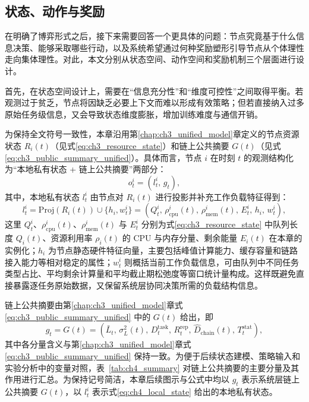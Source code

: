 \subsection{状态、动作与奖励}
\label{subsec:ch4_reward_design}

在明确了博弈形式之后，接下来需要回答一个更具体的问题：节点究竟基于什么信息决策、能够采取哪些行动，以及系统希望通过何种奖励塑形引导节点从个体理性走向集体理性。对此，本文分别从状态空间、动作空间和奖励机制三个层面进行设计。

首先，在状态空间设计上，需要在“信息充分性”和“维度可控性”之间取得平衡。若观测过于贫乏，节点将因缺乏必要上下文而难以形成有效策略；但若直接纳入过多原始任务级信息，又会导致状态维度膨胀，增加训练难度与通信开销。

为保持全文符号一致性，本章沿用第\ref{chap:ch3_unified_model}章定义的节点资源状态 $R_i(t)$（见式\eqref{eq:ch3_resource_state}）和链上公共摘要 $G(t)$（见式\eqref{eq:ch3_public_summary_unified}）。具体而言，节点 $i$ 在时刻 $t$ 的观测结构化为“本地私有状态 + 链上公共摘要”两部分：
\begin{equation}
    o_t^i = \left(l_t^i,\,g_t\right),
    \label{eq:ch4_obs_split}
\end{equation}
其中，本地私有状态 $l_t^i$ 由节点对 $R_i(t)$ 进行投影并补充工作负载特征得到：
\begin{equation}
    l_t^i = \mathrm{Proj}\!\left(R_i(t)\right) \cup \{h_i, w_t^i\}
    = \left(Q_t^i,\,\rho_{\mathrm{cpu}}^i(t),\,\rho_{\mathrm{mem}}^i(t),\,E_t^i,\,h_i,\,w_t^i\right),
    \label{eq:ch4_local_state}
\end{equation}
这里 $Q_t^i$、$\rho_{\mathrm{cpu}}^i(t)$、$\rho_{\mathrm{mem}}^i(t)$ 与 $E_t^i$ 分别为式\eqref{eq:ch3_resource_state} 中队列长度 $Q_i(t)$、资源利用率 $\rho_i(t)$ 的 CPU 与内存分量、剩余能量 $E_i(t)$ 在本章的实例化；$h_i$ 为节点静态硬件特征向量，主要包括峰值计算能力、缓存容量和链路接入能力等相对稳定的属性；$w_t^i$ 则概括当前工作负载信息，可由队列中不同任务类型占比、平均剩余计算量和平均截止期松弛度等窗口统计量构成。这样既避免直接暴露逐任务原始数据，又保留系统层协同决策所需的负载结构信息。

链上公共摘要由第\ref{chap:ch3_unified_model}章式\eqref{eq:ch3_public_summary_unified} 中的 $G(t)$ 给出，即
\begin{equation}
    g_t = G(t) = \left(\bar{L}_t,\,\sigma_L^2(t),\,D_t^{\mathrm{task}},\,R_t^{\mathrm{rep}},\,\hat{D}_{\mathrm{chain}}(t),\,T_t^{\mathrm{stat}}\right),
    \label{eq:ch4_global_summary}
\end{equation}
其中各分量含义与第\ref{chap:ch3_unified_model}章式\eqref{eq:ch3_public_summary_unified} 保持一致。为便于后续状态建模、策略输入和实验分析中的变量对照，表~\ref{tab:ch4_summary} 对链上公共摘要的主要分量及其作用进行汇总。为保持记号简洁，本章后续图示与公式中均以 $g_t$ 表示系统层链上公共摘要 $G(t)$，以 $l_t^i$ 表示式\eqref{eq:ch4_local_state} 给出的本地私有状态。

